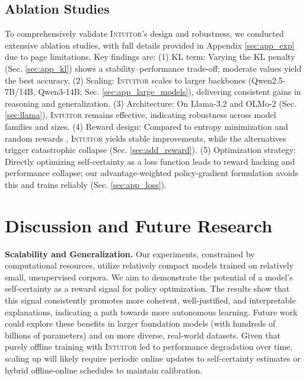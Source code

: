 \documentclass{article} %
\newcommand{\methodname}{\textsc{Intuitor}\xspace}
\begin{document}
\subsection{Ablation Studies}
To comprehensively validate \methodname's design and robustness, we conducted extensive ablation studies, with full details provided in Appendix \ref{sec:app_exp} due to page limitations. Key findings are: (1) KL term: Varying the KL penalty (Sec. \ref{sec:app_kl}) shows a stability–performance trade-off; moderate values yield the best accuracy.
(2) Scaling: \methodname scales to larger backbones (Qwen2.5-7B/14B, Qwen3-14B; Sec. \ref{sec:app_large_models}), delivering consistent gains in reasoning and generalization.
(3) Architecture: On Llama-3.2 and OLMo-2 (Sec. \ref{sec:llama}), \methodname remains effective, indicating robustness across model families and sizes.
(4) Reward design: Compared to entropy minimization \citep{agarwal2025unreasonable} and random rewards \citep{shao2025spurious}, \methodname yields stable improvements, while the alternatives trigger catastrophic collapse (Sec. \ref{sec:add_reward}).
(5) Optimization strategy: Directly optimizing self-certainty as a loss function leads to reward hacking and performance collapse; our advantage-weighted policy-gradient formulation avoids this and trains reliably (Sec. \ref{sec:app_loss}).

\section{Discussion and Future Research}

\textbf{Scalability and Generalization. }
Our experiments, constrained by computational resources, utilize relatively compact models trained on relatively small, unsupervised corpora. We aim to demonstrate the potential of a model's self-certainty as a reward signal for policy optimization. The results show that this signal consistently promotes more coherent, well-justified, and interpretable explanations, indicating a path towards more autonomous learning. Future work could explore these benefits in larger foundation models (with hundreds of billions of parameters) and on more diverse, real-world datasets. Given that purely offline training with \methodname led to performance degradation over time, scaling up will likely require periodic online updates to self-certainty estimates or hybrid offline-online schedules to maintain calibration.

\end{document}
